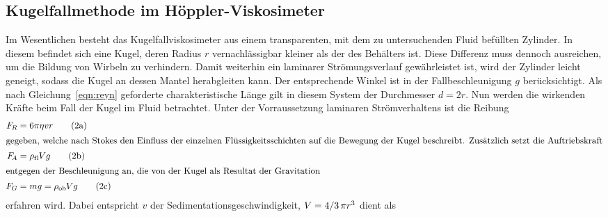 \newpage

\subsection[Kugelfallmethode im Höppler\hspace{0.15ex}-\hspace{-0.15ex}Viskosimeter]
		   {Kugelfallmethode im Höppler\hspace{0.15ex}-\hspace{-0.15ex}Viskosimeter \textnormal{\cite{viskos}}}

Im Wesentlichen besteht das Kugelfallviskosimeter aus einem transparenten, mit dem zu untersuchenden Fluid befüllten
Zylinder. In diesem befindet sich eine Kugel, deren Radius $r$ vernachlässigbar kleiner als der des Behälters ist.
Diese Differenz muss dennoch ausreichen, um die Bildung von Wirbeln zu verhindern. Damit weiterhin ein laminarer
Strömungsverlauf gewährleistet ist, wird der Zylinder leicht geneigt, sodass die Kugel an dessen Mantel herabgleiten
kann. Der entsprechende Winkel ist in der Fallbeschleunigung $g$ berücksichtigt. Als nach Gleichung~\eqref{eqn:reyn}
geforderte charakteristische Länge gilt in diesem System der Durchmesser $d = 2r$. Nun werden die wirkenden Kräfte
beim Fall der Kugel im Fluid betrachtet. Unter der Vorraussetzung laminaren Strömverhaltens ist die Reibung
\begin{align}
	F_{\hspace{-0.15ex}R} &= 6 \pi \eta v r
	\stepcounter{equation}\tag{2a}
	\label{eqn:stok} \\
	\intertext{gegeben, welche nach Stokes den Einfluss der einzelnen Flüssigkeitsschichten auf die Bewegung der Kugel
			   beschreibt. Zusätzlich setzt die Auftriebskraft}
	F_{\hspace{-0.3ex}A} &= \rho_\text{f\hspace{0.15ex}l} \hspace{-0.1ex}V\hspace{-0.05ex} g
	\tag{2b}
	\label{eqn:auf} \\
	\intertext{entgegen der Beschleunigung an, die von der Kugel als Resultat der Gravitation}
	F_{\hspace{-0.075ex}G} &= m g = \rho_\text{ob} \hspace{-0.1ex}V\hspace{-0.05ex} g
	\tag{2c}
	\label{eqn:grav}
\end{align}
erfahren wird. Dabei entspricht $v$ der Sedimentationsgeschwindigkeit, $V\hspace{-0.05ex} = 4/3 \, \pi r^3$ dient als
